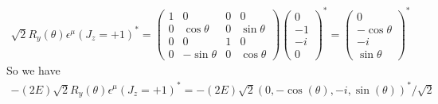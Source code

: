 \documentclass[11pt]{article}
\def\eps{\epsilon}
\def\th{\theta}
\begin{document}
\section{ }
\begin{eqnarray}
    \sqrt{2} R_y(\theta) \eps^\mu(J_z=+1)^* = 
    \begin{pmatrix}
        1 & 0 & 0 & 0 \\
        0 &\cos\theta & 0 &\sin\theta \\
        0 & 0 & 1 & 0\\
        0 &-\sin\theta & 0 & \cos\theta
    \end{pmatrix}
    \begin{pmatrix}
        0 \\ -1 \\ -i \\ 0 
    \end{pmatrix}^*
    =
    \begin{pmatrix}
        0 \\ -\cos\th \\ -i \\ \sin\th
    \end{pmatrix}^*
\end{eqnarray}
So we have
\begin{eqnarray}
    -(2E)\sqrt{2} R_y(\theta) \eps^\mu(J_z=+1)^* 
    =-(2E)\sqrt{2} ( 0, -\cos(\theta), -i, \sin(\theta) )^*/\sqrt{2}
\end{eqnarray}
\end{document}
